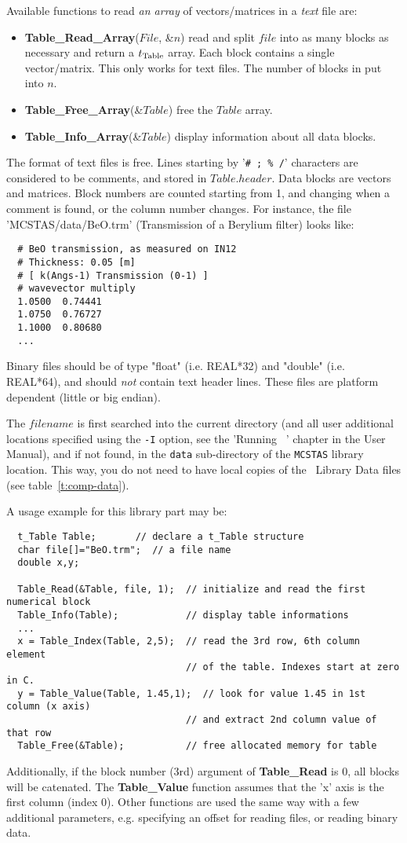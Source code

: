 Available functions to read \emph{an array} of vectors/matrices in a \emph{text} file are:
\begin{itemize}
\item {\bf Table\_Read\_Array}($File$, \&$n$) read and split $file$
into as many blocks as necessary and return a $t_{\rm Table}$ array.
Each block contains a single vector/matrix. This only works for text files.
The number of blocks in put into $n$.
\item {\bf Table\_Free\_Array}(\&$Table$) free the $Table$ array.
\item {\bf Table\_Info\_Array}(\&$Table$) display information about all data blocks.
\end{itemize}

The format of text files is free. Lines starting by '\verb+# ; % /+' characters are considered to be comments, and stored in $Table.header$. Data blocks are vectors and matrices. Block numbers are counted starting from 1, and changing when a comment is found, or the column number changes. For instance, the file 'MCSTAS/data/BeO.trm' (Transmission of a Berylium filter) looks like:
\begin{verbatim}
  # BeO transmission, as measured on IN12
  # Thickness: 0.05 [m]
  # [ k(Angs-1) Transmission (0-1) ]
  # wavevector multiply
  1.0500  0.74441
  1.0750  0.76727
  1.1000  0.80680
  ...
\end{verbatim}
Binary files should be of type "float" (i.e. REAL*32) and "double" (i.e. REAL*64),
and should \emph{not} contain text header lines. These files are platform
dependent (little or big endian).

The $filename$ is first searched into the current directory (and all user additional locations specified using the \verb+-I+ option, see the 'Running \MCS\ ' chapter in the User Manual), and if not found, in the \verb+data+ sub-directory of the \verb+MCSTAS+ library location. 
 This way, you do not need to have local copies of the \MCS\ Library Data files (see table~\ref{t:comp-data}).

A usage example for this library part may be:
\begin{verbatim}
  t_Table Table;       // declare a t_Table structure
  char file[]="BeO.trm";  // a file name
  double x,y;

  Table_Read(&Table, file, 1);  // initialize and read the first numerical block
  Table_Info(Table);            // display table informations
  ...
  x = Table_Index(Table, 2,5);  // read the 3rd row, 6th column element
                                // of the table. Indexes start at zero in C.
  y = Table_Value(Table, 1.45,1);  // look for value 1.45 in 1st column (x axis)
                                // and extract 2nd column value of that row
  Table_Free(&Table);           // free allocated memory for table
\end{verbatim}
Additionally, if the block number (3rd) argument of  {\bf Table\_Read} is 0, all blocks will be catenated.
The {\bf Table\_Value} function assumes that the 'x' axis is the first column (index 0).
Other functions are used the same way with a few additional parameters, e.g. specifying an offset for reading files, or reading binary data.

